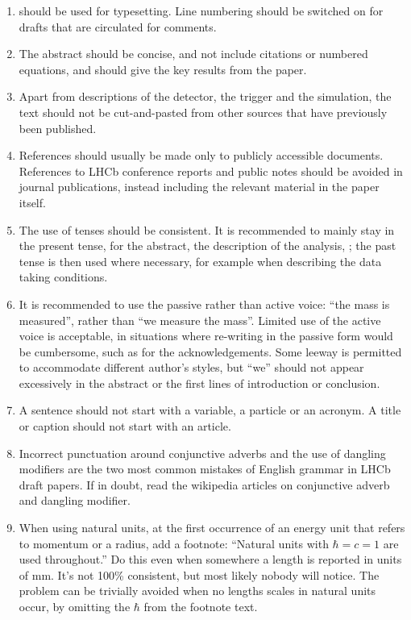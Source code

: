 \begin{enumerate}
\item \latex should be used for typesetting. Line numbering should be
  switched on for drafts that are circulated for comments.

\item The abstract should be concise, and not include citations or
  numbered equations, and should give the key results from the paper.

\item Apart from descriptions of the detector, the trigger and the
  simulation, the text should not be cut-and-pasted from other sources
  that have previously been published.

\item References should usually be made only to publicly accessible
  documents. References to LHCb conference reports and public notes
  should be avoided in journal publications, instead including the
  relevant material in the paper itself.

\item The use of tenses should be consistent. It is recommended to
  mainly stay in the present tense, for the abstract, the description
  of the analysis, \etc; the past tense is then used where necessary,
  for example when describing the data taking conditions.

\item It is recommended to use the passive rather than active voice:
  ``the mass is measured'', rather than ``we measure the mass''.
  Limited use of the active voice is acceptable, in situations where
  re-writing in the passive form would be cumbersome, such as for the
  acknowledgements.  Some leeway is permitted to accommodate different
  author's styles, but ``we'' should not appear excessively in the
  abstract or the first lines of introduction or conclusion.

\item A sentence should not start with a variable, a particle or an acronym.
 A title or caption should not start with an article. 

\item Incorrect punctuation around conjunctive adverbs and the use of 
dangling modifiers are the two most common mistakes of English grammar
in LHCb draft papers. If in doubt, read the wikipedia articles on 
conjunctive adverb and dangling modifier.  

\item When using natural units, at the first occurrence of an energy unit
      that refers to momentum or a radius, add a footnote: ``Natural units
      with $\hbar=c=1$ are used throughout.'' Do this even when somewhere
      a length is reported in units of mm. It's not 100\% consistent, but
      most likely nobody will notice. The problem can be trivially avoided
      when no lengths scales in natural units occur, by omitting the 
      $\hbar$ from the footnote text.


\end{enumerate}

